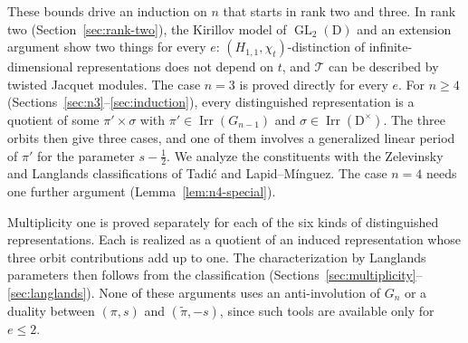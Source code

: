 \documentclass[11pt]{amsart}
\numberwithin{equation}{section}
\theoremstyle{plain}
\theoremstyle{definition}
\theoremstyle{remark}
\newcommand{\T}{\mathcal{T}}
\DeclareMathOperator{\GL}{GL}
\DeclareMathOperator{\Irr}{Irr}
\begin{document}
These bounds drive an induction on $n$ that starts in rank two and three. In rank two (Section~\ref{sec:rank-two}), the Kirillov model of $\GL_2(\mathrm{D})$ and an extension argument show two things for every $e$: $(H_{1,1},\chi_t)$-distinction of infinite-dimensional representations does not depend on $t$, and $\T$ can be described by twisted Jacquet modules. The case $n=3$ is proved directly for every $e$. For $n\ge4$ (Sections~\ref{sec:n3}--\ref{sec:induction}), every distinguished representation is a quotient of some $\pi'\times\sigma$ with $\pi'\in\Irr(G_{n-1})$ and $\sigma\in\Irr(\mathrm{D}^\times)$. The three orbits then give three cases, and one of them involves a generalized linear period of $\pi'$ for the parameter $s-\frac12$. We analyze the constituents with the Zelevinsky and Langlands classifications of Tadi\'c and Lapid--M\'inguez. The case $n=4$ needs one further argument (Lemma~\ref{lem:n4-special}).

Multiplicity one is proved separately for each of the six kinds of distinguished representations. Each is realized as a quotient of an induced representation whose three orbit contributions add up to one. The characterization by Langlands parameters then follows from the classification (Sections~\ref{sec:multiplicity}--\ref{sec:langlands}). None of these arguments uses an anti-involution of $G_n$ or a duality between $(\pi,s)$ and $(\widetilde\pi,-s)$, since such tools are available only for $e\le2$.
\end{document}
